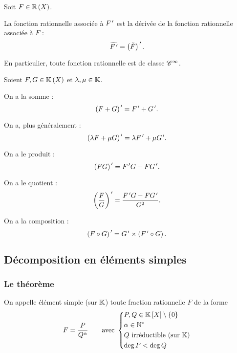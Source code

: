 \begin{rem}
Soit \(F\in\fracrat[\R]\).

La fonction rationnelle associée à \(F^{\,\prime}\) est la dérivée de la fonction rationnelle associée à \(F\) : \[\widetilde{F^{\,\prime}}=\left(\tilde{F}\right)^{\,\prime}.\]

En particulier, toute fonction rationnelle est de classe \(\mathscr{C}^{\infty}\).
\end{rem}

\begin{prop}
Soient \(F,G\in\fracrat\) et \(\lambda,\mu\in\mathbb{K}\).

On a la somme : \[\left(F+G\right)^{\,\prime}=F^{\,\prime}+G^{\,\prime}.\]

On a, plus généralement : \[\left(\lambda F+\mu G\right)^{\,\prime}=\lambda F^{\,\prime}+\mu G^{\,\prime}.\]

On a le produit : \[\left(FG\right)^{\,\prime}=F^{\,\prime} G+FG^{\,\prime}.\]

On a le quotient : \[\left(\dfrac{F}{G}\right)^{\,\prime}=\dfrac{F^{\,\prime} G-FG^{\,\prime}}{G^2}.\]

On a la composition : \[\left(F\circ G\right)^{\,\prime}=G^{\,\prime}\times\left(F^{\,\prime}\circ G\right).\]
\end{prop}

\begin{dem}
\end{dem}

\subsection{Décomposition en éléments simples}

\subsubsection{Le théorème}

\begin{defi}
On appelle élément simple (sur \(\mathbb{K}\)) toute fraction rationnelle \(F\) de la forme \[F=\dfrac{P}{Q^{\alpha}}\qquad\text{avec }\begin{dcases}P,Q\in\poly\excluant\accol{0} \\ \alpha\in\Ns \\ Q\text{ irréductible (sur \(\K\))} \\ \deg P<\deg Q\end{dcases}\]
\end{defi}

